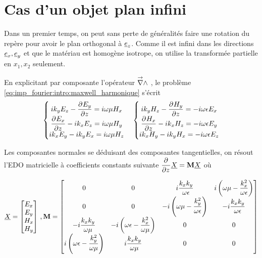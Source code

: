 \section{Cas d'un objet plan infini}

    Dans un premier temps, on peut sans perte de généralités faire une rotation du repère pour avoir le plan orthogonal à $\v e_z$. Comme il est infini dans les directions $\v e_x, \v e_y$ et que le matériau est homogène isotrope, on utilise la transformée partielle en $x_1, x_2$ seulement.

    En explicitant par composante l'opérateur $\vrot$ , le problème \eqref{eq:imp_fourier:intro:maxwell_harmonique} s'écrit  
    \begin{align*}
        \left\lbrace 
        \begin{matrix}
        ik_y E_z  - \ddr{z}{E_y} = i \w \mu H_x \\
        \ddr{z}{E_x} - ik_x E_z = i\w \mu H_y \\
        ik_x E_y - ik_y E_x = i\w \mu H_z \\
        \end{matrix}
        \right. \quad 
        \left\lbrace 
        \begin{matrix}
        ik_y H_z  - \ddr{z}{H_y} = -i \w \eps E_x \\
        \ddr{z}{H_x} - ik_x H_z = -i\w \eps E_y \\
        ik_x H_y - ik_y H_x = -i\w \eps E_z \\
        \end{matrix}
        \right.
    \end{align*}

    Les composantes normales se déduisant des composantes tangentielles, on résout l'EDO matricielle à coefficients constants 
    suivante $\ddr{z}{}\v{X} = \mat{M} \v{X}$ où

    \begin{equation}
        \v{X} = 
        \begin{bmatrix}
        E_x \\ 
        E_y \\ 
        H_x \\ 
        H_y \\
        \end{bmatrix}\,,
        \mat{M} = \begin{bmatrix}
        0 & 0 & i\frac{k_xk_y}{\w\eps} & i\left(\w\mu - \frac{k_x^2}{\w\eps}\right)\\
        0 & 0 & -i\left(\w\mu - \frac{k_y^2}{\w\eps}\right) & -i\frac{k_xk_y}{\w\eps}\\
        -i\frac{k_xk_y}{\w\mu} & -i\left(\w\eps - \frac{k_x^2}{\w\mu}\right) & 0 & 0 \\
        i\left(\w\eps - \frac{k_y^2}{\w\mu}\right) & i\frac{k_xk_y}{\w\mu} & 0 & 0 \\
        \end{bmatrix}
    \end{equation}

